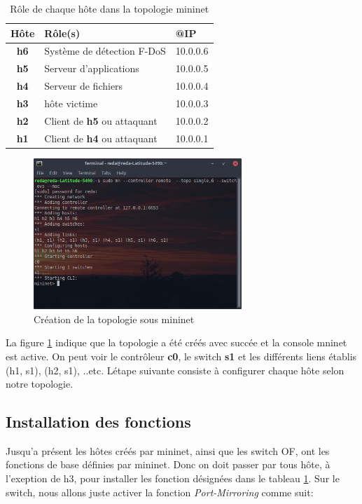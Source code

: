 \begin{table}
\begin{center}
\begin{tabular}{  | c || m{5cm} | m{3cm} | }
\hline
\rowcolor[rgb]{0.85,0.85,0.85}
Hôte & Rôle(s) & @IP\\
\hline
\textbf{h6} & Système de détection F-DoS & 10.0.0.6\\
\hline
\textbf{h5} & Serveur d'applications & 10.0.0.5\\
\hline
\textbf{h4} & Serveur de fichiers & 10.0.0.4\\
\hline
\textbf{h3} & hôte victime & 10.0.0.3\\
\hline
\textbf{h2} & Client de \textbf{h5} ou attaquant & 10.0.0.2\\
\hline
\textbf{h1} & Client de \textbf{h4} ou attaquant & 10.0.0.1\\
\hline
\end{tabular}
\caption{Rôle de chaque hôte dans la topologie mininet}
\label{table:nodes}
\end{center}
\end{table}

\begin{figure}[h]
\centering
\includegraphics[width=0.7\textwidth]{Figures/simulation/mininet/start}
\decoRule
\caption{Création de la topologie sous mininet}
\label{fig:topologie}
\end{figure}

\newpage
La figure \ref{fig:topologie} indique que la topologie a été créés avec succée et la console mninet est active. On peut voir le contrôleur \textbf{c0}, le switch \textbf{s1} et les différents liens établis (h1, s1), (h2, s1), ..etc. Létape suivante consiste à configurer chaque hôte selon notre topologie.

\subsection{Installation des fonctions}
Jusqu'a présent les hôtes créés par mininet, ainsi que les switch OF, ont les fonctions de base définies par mininet. Donc on doit passer par tous hôte, à l'exeption de h3, pour installer les fonction désignées dans le tableau \ref{table:nodes}. Sur le switch, nous allons juste activer la fonction \textit{Port-Mirroring} comme suit:

